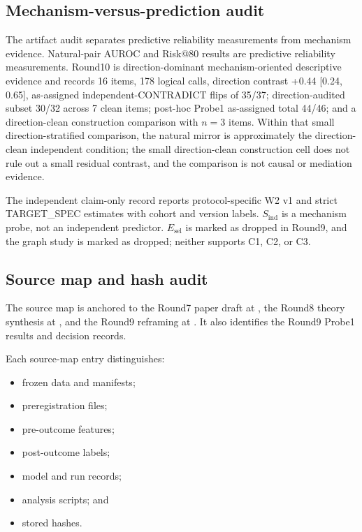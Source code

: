 \documentclass[11pt]{article}
\begin{document}
\subsection{Mechanism-versus-prediction audit}

The artifact audit separates predictive reliability measurements from mechanism evidence. Natural-pair AUROC and Risk@80 results are predictive reliability measurements. Round10 is direction-dominant mechanism-oriented descriptive evidence and records 16 items, 178 logical calls, direction contrast +0.44 [0.24, 0.65], as-assigned independent-CONTRADICT flips of 35/37; direction-audited subset 30/32 across 7 clean items; post-hoc Probe1 as-assigned total 44/46; and a direction-clean construction comparison with \(n=3\) items. Within that small direction-stratified comparison, the natural mirror is approximately the direction-clean independent condition; the small direction-clean construction cell does not rule out a small residual contrast, and the comparison is not causal or mediation evidence.

The independent claim-only record reports protocol-specific W2 v1 and strict TARGET\_\allowbreak{}SPEC estimates with cohort and version labels. \(S_{\text{ind}}\) is a mechanism probe, not an independent predictor. \(E_{\text{sel}}\) is marked as dropped in Round9, and the graph study is marked as dropped; neither supports C1, C2, or C3.

\subsection{Source map and hash audit}

The source map is anchored to the Round7 paper draft at , the Round8 theory synthesis at , and the Round9 reframing at . It also identifies the Round9 Probe1 results and decision records.

Each source-map entry distinguishes:

\begin{itemize}
  \item frozen data and manifests;
  \item preregistration files;
  \item pre-outcome features;
  \item post-outcome labels;
  \item model and run records;
  \item analysis scripts; and
  \item stored hashes.
\end{itemize}
\end{document}
